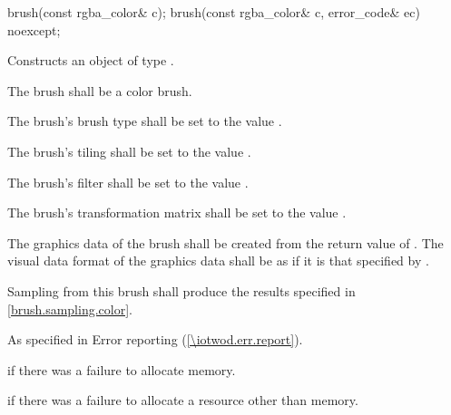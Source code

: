 \begin{itemdecl}
brush(const rgba_color& c);
brush(const rgba_color& c, error_code& ec) noexcept;
\end{itemdecl}
\begin{itemdescr}
\pnum
\effects
Constructs an object of type .

\pnum
The brush shall be a color brush.

\pnum
The brush's brush type shall be set to the value .

\pnum
The brush's tiling shall be set to the value .

\pnum
The brush's filter shall be set to the value .

\pnum
The brush's transformation matrix shall be set to the value .

\pnum
The graphics data of the brush shall be created from the return value of . The visual data format of the graphics data shall be as if it is that specified by .

\pnum
\remarks
Sampling from this brush shall produce the results specified in \ref{brush.sampling.color}.

\pnum
\throws
As specified in Error reporting (\ref{\iotwod.err.report}).

\pnum
\errors
{} if there was a failure to allocate memory.

 if there was a failure to allocate a resource other than memory.
\end{itemdescr}

